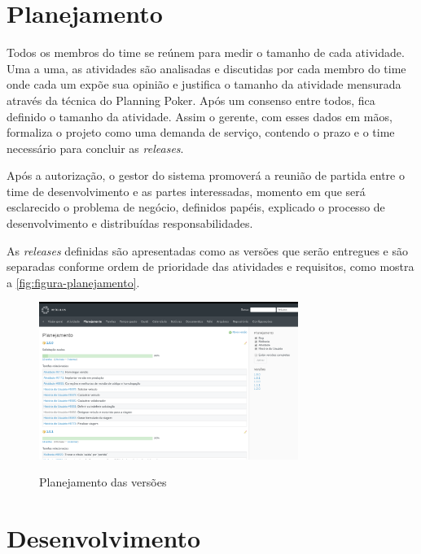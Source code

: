 \section{Planejamento}
\label{sec:atividadesRealizadasPlanejamento}

Todos os membros do time se reúnem para medir o tamanho de cada atividade. Uma a uma, as atividades são analisadas e discutidas por cada membro do time onde cada um expõe sua opinião e justifica o tamanho da atividade mensurada através da técnica do Planning Poker. Após um consenso entre todos, fica definido o tamanho da atividade. Assim o gerente, com esses dados em mãos, formaliza o projeto como uma demanda de serviço, contendo o prazo e o time necessário para concluir as \textit{releases}.

\begin{citacao}
Após a autorização, o gestor do sistema promoverá a reunião de
partida entre o time de desenvolvimento e as partes interessadas, momento em que será
esclarecido o problema de negócio, definidos papéis, explicado o processo de
desenvolvimento e distribuídas responsabilidades.\cite[p.~2]{Portaria37:2017}
\end{citacao}

As \textit{releases} definidas são apresentadas como as versões que serão entregues e são separadas conforme ordem de prioridade das atividades e requisitos, como mostra a \autoref{fig:figura-planejamento}.

\begin{figure}[!htb]
    \centering
    \caption{Planejamento das versões}
    \includegraphics[width=0.75\textwidth]{dados/figuras/veiculos-planejamento.png}
    \label{fig:figura-planejamento}
\end{figure}

\section{Desenvolvimento}
\label{sec:atividadesRealizadasDesenvolvimento}


